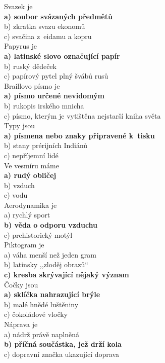 \begin{multicols}{3}
\noindent
Svazek je\\
\textbf{a) soubor svázaných předmětů}\\
b) zkratka svazu ekonomů\\
c) svačina z~eidamu a kopru\\

\noindent
Papyrus je\\
\textbf{a) latinské slovo označující papír}\\
b) ruský dědeček\\
c) papírový pytel plný švábů rusů\\

\noindent
Braillovo písmo je\\
\textbf{a) písmo určené nevidomým}\\
b) rukopis irského mnicha\\
c) písmo, kterým je vytištěna nejstarší kniha světa\\

\noindent
Typy jsou\\
\textbf{a) písmena nebo znaky připravené k~tisku}\\
b) stany prérijních Indiánů\\
c) nepříjemní lidé\\

\noindent
Ve vesmíru máme\\
\textbf{a) rudý obličej}\\
b) vzduch\\
c) vodu\\

\noindent
Aerodynamika je\\
a) rychlý sport\\
\textbf{b) věda o odporu vzduchu}\\
c) prehistorický motýl\\

\noindent
Piktogram je\\
a) váha menší než jeden gram\\
b) latinsky ,,zloděj obrazů``\\
\textbf{c) kresba skrývající nějaký význam}\\

\noindent
Čočky jsou\\
\textbf{a) sklíčka nahrazující brýle}\\
b) malé hnědé luštěniny\\
c) čokoládové vločky\\

\noindent
Náprava je\\
a) nádrž právě naplněná\\
\textbf{b) příčná součástka, jež drží kola}\\
c) dopravní značka ukazující doprava\\


\end{multicols}
